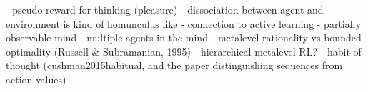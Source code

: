 \label{conclusion}


- pseudo reward for thinking (pleasure)
- dissociation between agent and environment is kind of homunculus like
- connection to active learning
- partially observable mind
- multiple agents in the mind
- metalevel rationality vs bounded optimality (Russell \& Subramanian, 1995)
- hierarchical metalevel RL?
  - habit of thought (cushman2015habitual, and the paper distinguishing sequences from action values)
